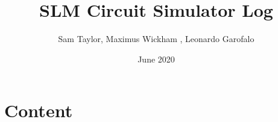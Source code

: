 \documentclass{article}
\title{SLM Circuit Simulator Log}
\author{Sam Taylor, Maximus Wickham , Leonardo Garofalo}
\date{June 2020}
\begin{document}
\maketitle

\section{Content}
\end{document}
